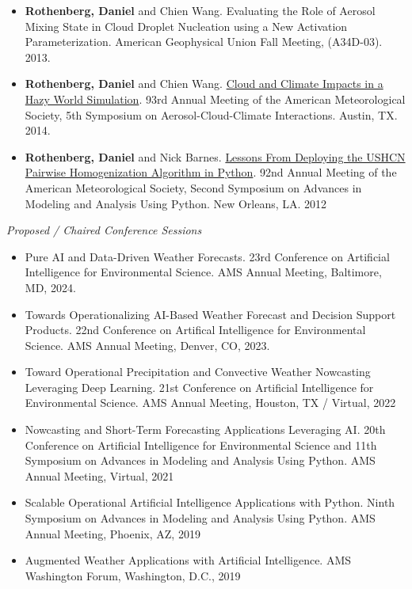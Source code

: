 \documentclass[11pt,letterpaper]{article}
\begin{document}
\begin{itemize}[itemindent=-10pt]
 \item \textbf{Rothenberg, Daniel} and Chien Wang. Evaluating the Role of Aerosol Mixing State in Cloud Droplet Nucleation using a New Activation Parameterization. American Geophysical Union Fall Meeting, (A34D-03). 2013.

 \item \textbf{Rothenberg, Daniel} and Chien Wang. \href{http://figshare.com/articles/AMS_2014_Evaluating_the_Role_of_Aerosol_Mixing_State_in_Cloud_Droplet_Nucleation_towards_Developing_a_New_Activation_Parameterization/918655}{Cloud and Climate Impacts in a Hazy World Simulation}. 93rd Annual Meeting of the American Meteorological Society, 5th Symposium on Aerosol-Cloud-Climate Interactions. Austin, TX. 2014.

 \item \textbf{Rothenberg, Daniel} and Nick Barnes. \href{https://ams.confex.com/ams/92Annual/webprogram/Paper198219.html}{Lessons From Deploying the USHCN Pairwise Homogenization Algorithm in Python}. 92nd Annual Meeting of the American Meteorological Society, Second Symposium on Advances in Modeling and Analysis Using Python. New Orleans, LA. 2012
\end{itemize}

\bigskip
\emph{Proposed / Chaired Conference Sessions}
\medskip
\begin{itemize}[itemindent=-10pt]

 \item Pure AI and Data-Driven Weather Forecasts. 23rd Conference on Artificial Intelligence for Environmental Science. AMS Annual Meeting, Baltimore, MD, 2024.

 \item Towards Operationalizing AI-Based Weather Forecast and Decision Support Products. 22nd Conference on Artifical Intelligence for Environmental Science. AMS Annual Meeting, Denver, CO, 2023.

 \item Toward Operational Precipitation and Convective Weather Nowcasting Leveraging Deep Learning. 21st Conference on Artificial Intelligence for Environmental Science. AMS Annual Meeting, Houston, TX / Virtual, 2022

 \item Nowcasting and Short-Term Forecasting Applications Leveraging AI. 20th Conference on Artificial Intelligence for Environmental Science and 11th Symposium on Advances in Modeling and Analysis Using Python. AMS Annual Meeting, Virtual, 2021

 \item Scalable Operational Artificial Intelligence Applications with Python. Ninth Symposium on Advances in Modeling and Analysis Using Python. AMS Annual Meeting, Phoenix, AZ, 2019
 
 \item Augmented Weather Applications with Artificial Intelligence. AMS Washington Forum, Washington, D.C., 2019
 

\end{itemize}
\end{document}
